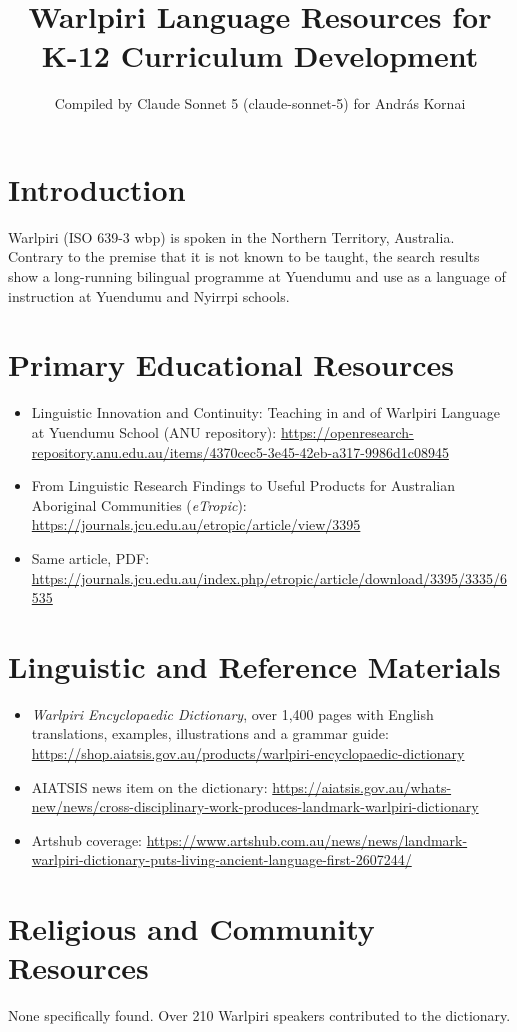 \documentclass[12pt]{article}
\title{Warlpiri Language Resources for K-12 Curriculum Development}
\author{Compiled by Claude Sonnet 5 (claude-sonnet-5) for Andr\'as Kornai}
\date{}
\begin{document}
\maketitle
\section{Introduction}
Warlpiri (ISO 639-3 wbp) is spoken in the Northern Territory, Australia. Contrary to the premise that it is not known to be taught, the search results show a long-running bilingual programme at Yuendumu and use as a language of instruction at Yuendumu and Nyirrpi schools.
\section{Primary Educational Resources}
\begin{itemize}
\item Linguistic Innovation and Continuity: Teaching in and of Warlpiri Language at Yuendumu School (ANU repository): \url{https://openresearch-repository.anu.edu.au/items/4370cec5-3e45-42eb-a317-9986d1c08945}
\item From Linguistic Research Findings to Useful Products for Australian Aboriginal Communities (\emph{eTropic}): \url{https://journals.jcu.edu.au/etropic/article/view/3395}
\item Same article, PDF: \url{https://journals.jcu.edu.au/index.php/etropic/article/download/3395/3335/6535}
\end{itemize}
\section{Linguistic and Reference Materials}
\begin{itemize}
\item \emph{Warlpiri Encyclopaedic Dictionary}, over 1,400 pages with English translations, examples, illustrations and a grammar guide: \url{https://shop.aiatsis.gov.au/products/warlpiri-encyclopaedic-dictionary}
\item AIATSIS news item on the dictionary: \url{https://aiatsis.gov.au/whats-new/news/cross-disciplinary-work-produces-landmark-warlpiri-dictionary}
\item Artshub coverage: \url{https://www.artshub.com.au/news/news/landmark-warlpiri-dictionary-puts-living-ancient-language-first-2607244/}
\end{itemize}
\section{Religious and Community Resources}
None specifically found. Over 210 Warlpiri speakers contributed to the dictionary.
\end{document}
